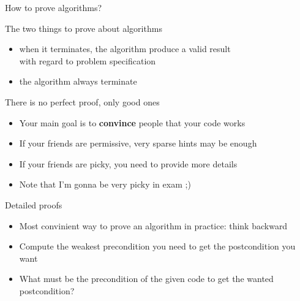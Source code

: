 \begin{frame}{How to prove algorithms?}
  \begin{block}{The two things to prove about algorithms}
    \begin{itemize}
    \item {}
      when it terminates, the algorithm produce a valid result\\
      {\small with regard to problem specification}
    \item {} the algorithm always terminate
    \end{itemize}
  \end{block}
  \begin{block}{There is no perfect proof, only good ones}
    \begin{itemize}
    \item Your main goal is to \textbf{convince} people that your code works
    \item If your friends are permissive, very sparse hints may be enough
    \item If your friends are picky, you need to provide more details
    \item Note that I'm gonna be very picky in exam ;)
    \end{itemize}
  \end{block}
  \begin{block}{Detailed proofs}
    \begin{itemize}
    \item Most convinient way to prove an algorithm in practice: think backward
    \item Compute the weakest precondition you need to get the postcondition you
      want
    \item What must be the precondition of the given code to get the
        wanted postcondition?
    \end{itemize}
  \end{block}
\end{frame}
\newcommand{\WP}[1]{\textbf{WP}($#1$)}
